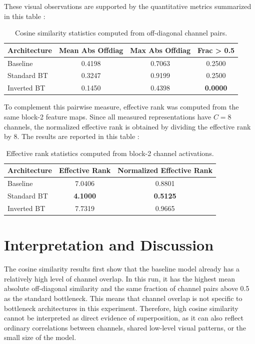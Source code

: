 \documentclass[12pt,a4paper]{report}
\begin{document}
These visual observations are supported by the quantitative metrics summarized in this table : 

\begin{table}[H]
\centering
\begin{tabular}{lccc}
\toprule
Architecture & Mean Abs Offdiag & Max Abs Offdiag & Frac > 0.5 \\
\midrule
Baseline      & 0.4198 & 0.7063 & 0.2500 \\
Standard BT   & 0.3247 & 0.9199 & 0.2500 \\
Inverted BT   & 0.1450 & 0.4398 & \textbf{0.0000} \\
\bottomrule
\end{tabular}
\caption{Cosine similarity statistics computed from off-diagonal channel pairs.}
\label{tab:results_stats}
\end{table}

To complement this pairwise measure, effective rank was computed from the same block-2 feature maps. Since all measured representations have \(C=8\) channels, the normalized effective rank is obtained by dividing the effective rank by 8. The results are reported in this table : 

\begin{table}[ht]
\centering
\begin{tabular}{lcc}
\toprule
Architecture & Effective Rank & Normalized Effective Rank \\
\midrule
Baseline      & 7.0406 & 0.8801 \\
Standard BT   & \textbf{4.1000} & \textbf{0.5125} \\
Inverted BT   & 7.7319 & 0.9665 \\
\bottomrule
\end{tabular}
\caption{Effective rank statistics computed from block-2 channel activations.}
\label{tab:erank_stats}
\end{table}

\section{Interpretation and Discussion}The cosine similarity results first show that the baseline model already has a relatively high level of channel overlap. In this run, it has the highest mean absolute off-diagonal similarity and the same fraction of channel pairs above 0.5 as the standard bottleneck. This means that channel overlap is not specific to bottleneck architectures in this experiment. Therefore, high cosine similarity cannot be interpreted as direct evidence of superposition, as it can also reflect ordinary correlations between channels, shared low-level visual patterns, or the small size of the model.\\
\end{document}

